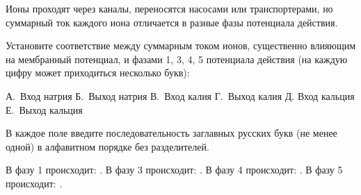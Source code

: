 
Ионы проходят через каналы, переносятся насосами или транспортерами, но суммарный ток каждого иона отличается в разные фазы потенциала действия.

Установите соответствие между суммарным током ионов, существенно влияющим на мембранный потенциал, и фазами 1, 3, 4, 5 потенциала действия (на каждую цифру может приходиться несколько букв):


А. Вход натрия
Б. Выход натрия
В. Вход калия
Г. Выход калия
Д. Вход кальция
Е. Выход кальция

В каждое поле введите последовательность заглавных русских букв (не менее одной) в алфавитном порядке без разделителей.

В фазу 1 происходит: \underline{\hspace{2in}}. В фазу 3 происходит: \underline{\hspace{2in}}. В фазу 4 происходит: \underline{\hspace{2in}}. В фазу 5 происходит: \underline{\hspace{2in}}.